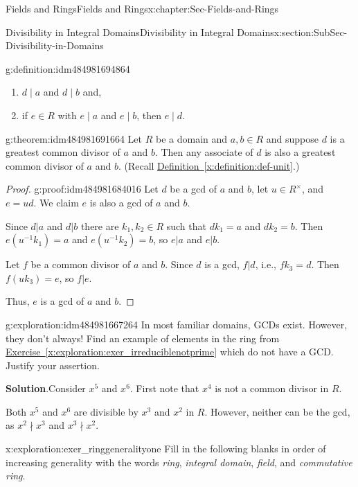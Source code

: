 \documentclass[oneside,10pt,]{book}
\newcommand{\blocktitlefont}{\relax}
\newcommand{\xreffont}{\relax}
\numberwithin{equation}{section}
\begin{document}
\begin{chapterptx}{Fields and Rings}{}{Fields and Rings}{}{}{x:chapter:Sec-Fields-and-Rings}
\begin{sectionptx}{Divisibility in Integral Domains}{}{Divisibility in Integral Domains}{}{}{x:section:SubSec-Divisibility-in-Domains}
\begin{definition}{}{g:definition:idm484981694864}
\begin{enumerate}
\item{}\(d\mid a\) and \(d\mid b\) and,%
\item{}if \(e\in R\) with \(e\mid a\) and \(e\mid b\), then \(e\mid d\).%
\end{enumerate}
%
\end{definition}
\begin{theorem}{}{}{g:theorem:idm484981691664}%
Let \(R\) be a domain and \(a,b\in R\) and suppose \(d\) is a greatest common divisor of \(a\) and \(b\). Then any associate of \(d\) is also a greatest common divisor of \(a\) and \(b\). (Recall \hyperref[x:definition:def-unit]{Definition~{\xreffont\ref{x:definition:def-unit}}}.)%
\end{theorem}
\begin{proof}{}{g:proof:idm484981684016}
Let \(d\) be a gcd of \(a\) and \(b\), let \(u\in R^\times\), and \(e =ud\). We claim \(e\) is also a gcd of \(a\) and \(b\).%
\par
Since \(d|a\) and \(d|b\) there are \(k_1,k_2\in R\) such that \(d k_1 = a\) and \(d k_2 = b\). Then \(e (u^{-1} k_1) = a\) and \(e (u^{-1} k_2) = b\), so \(e|a\) and \(e|b\).%
\par
Let \(f\) be a common divisor of \(a\) and \(b\). Since \(d\) is a gcd, \(f|d\), i.e., \(f k_3 = d\). Then \(f (uk_3) = e\), so \(f|e\).%
\par
Thus, \(e\) is a gcd of \(a\) and \(b\).%
\end{proof}
\begin{exploration}{}{g:exploration:idm484981667264}%
In most familiar domains, GCDs exist. However, they don't always! Find an example of elements in the ring from \hyperref[x:exploration:exer_irreduciblenotprime]{Exercise~{\xreffont\ref{x:exploration:exer_irreduciblenotprime}}} which do not have a GCD. Justify your assertion.%
\par\smallskip%
\noindent\textbf{\blocktitlefont Solution}.\hypertarget{g:solution:idm484981665920}{}\quad{}Consider \(x^5\) and \(x^6\). First note that \(x^4\) is not a common divisor in \(R\).%
\par
Both \(x^5\) and \(x^6\) are divisible by \(x^3\) and \(x^2\) in \(R\). However, neither can be the gcd, as \(x^2\nmid x^3\) and \(x^3\nmid x^2\).%
\end{exploration}
\begin{exploration}{}{x:exploration:exer_ringgeneralityone}%
Fill in the following blanks in order of increasing generality with the words \emph{ring}, \emph{integral domain}, \emph{field}, and \emph{commutative ring}.%

\end{exploration}
\end{sectionptx}
\end{chapterptx}
\end{document}
